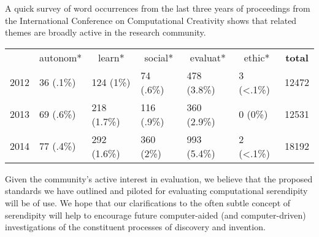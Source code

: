 A quick survey of word occurrences from the last three years of
proceedings from the International Conference on Computational
Creativity shows that related themes are broadly active in the
research community.

\medskip

{\centering \setlength{\tabcolsep}{7pt} \small
\hspace{-7pt}\begin{tabular}{r|l|l|l|l|l|l|}
\multicolumn{1}{r}{} & \multicolumn{1}{c}{autonom*} & \multicolumn{1}{c}{learn*} & \multicolumn{1}{c}{social*} & \multicolumn{1}{c}{evaluat*} & \multicolumn{1}{c}{ethic*} & \multicolumn{1}{c}{\textbf{total}}\\
\cline{2-7}
2012&36 (.1\%) & 124 (1\%) & 74 (.6\%) & 478 (3.8\%) & 3 (<.1\%) & 12472 \\
\cline{2-7}
2013&69 (.6\%) & 218 (1.7\%) & 116 (.9\%) & 360 (2.9\%) & 0 (0\%) & 12531\\
\cline{2-7}
2014&77 (.4\%) & 292 (1.6\%) & 360 (2\%) & 993 (5.4\%) & 2 (<.1\%) & 18192\\
\cline{2-7}
\end{tabular}

\par
}

\bigskip

\noindent Given the community's active interest in evaluation, we
believe that the proposed standards we have outlined and piloted for
evaluating computational serendipity will be of use.  We hope that our
clarifications to the often subtle concept of serendipity will help to
encourage future computer-aided (and computer-driven) investigations
of the constituent processes of discovery and invention.
